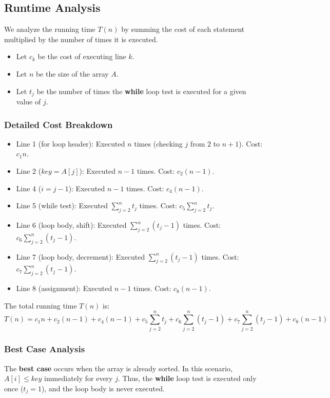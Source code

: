 \documentclass[12pt]{article}
\theoremstyle{blueplain}
\theoremstyle{bluedef}
\theoremstyle{blueremark}
\begin{document}
\subsection{Runtime Analysis}

We analyze the running time $T(n)$ by summing the cost of each statement multiplied by the number of times it is executed.
\begin{itemize}
    \item Let $c_k$ be the cost of executing line $k$.
    \item Let $n$ be the size of the array $A$.
    \item Let $t_j$ be the number of times the \textbf{while} loop test is executed for a given value of $j$.
\end{itemize}

\subsubsection{Detailed Cost Breakdown}

\begin{itemize}
    \item Line 1 (for loop header): Executed $n$ times (checking $j$ from $2$ to $n+1$). Cost: $c_1 n$.
    \item Line 2 ($key = A[j]$): Executed $n-1$ times. Cost: $c_2 (n-1)$.
    \item Line 4 ($i = j-1$): Executed $n-1$ times. Cost: $c_4 (n-1)$.
    \item Line 5 (while test): Executed $\sum_{j=2}^n t_j$ times. Cost: $c_5 \sum_{j=2}^n t_j$.
    \item Line 6 (loop body, shift): Executed $\sum_{j=2}^n (t_j - 1)$ times. Cost: $c_6 \sum_{j=2}^n (t_j - 1)$.
    \item Line 7 (loop body, decrement): Executed $\sum_{j=2}^n (t_j - 1)$ times. Cost: $c_7 \sum_{j=2}^n (t_j - 1)$.
    \item Line 8 (assignment): Executed $n-1$ times. Cost: $c_8 (n-1)$.
\end{itemize}

The total running time $T(n)$ is:
\[
    T(n) = c_1 n + c_2 (n-1) + c_4 (n-1) + c_5 \sum_{j=2}^n t_j + c_6 \sum_{j=2}^n (t_j - 1) + c_7 \sum_{j=2}^n (t_j - 1) + c_8 (n-1)
\]

\subsubsection{Best Case Analysis}
The \textbf{best case} occurs when the array is already sorted.
In this scenario, $A[i] \le key$ immediately for every $j$. Thus, the \textbf{while} loop test is executed only once ($t_j = 1$), and the loop body is never executed.
\end{document}
